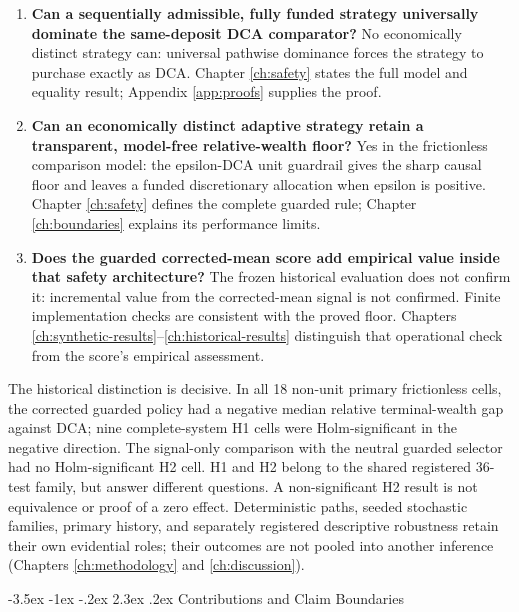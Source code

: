 \documentclass[12pt,a4paper,oneside]{report}
\makeatletter
\renewcommand\section{\@startsection{section}{1}{\z@}%
  {-3.5ex \@plus -1ex \@minus -.2ex}%
  {2.3ex \@plus .2ex}%
  {\normalfont\fontsize{14}{17}\selectfont\bfseries}}
\makeatother
\begin{document}
\begin{enumerate}
  \item \textbf{Can a sequentially admissible, fully funded strategy
  universally dominate the same-deposit DCA comparator?}
  No economically distinct strategy can: universal pathwise dominance forces
  the strategy to purchase exactly as DCA. Chapter \ref{ch:safety} states the
  full model and equality result; Appendix \ref{app:proofs} supplies the proof.
  \item \begin{minipage}[t]{\linewidth}
  \textbf{Can an economically distinct adaptive strategy retain a
  transparent, model-free relative-wealth floor?}
  Yes in the frictionless comparison model: the epsilon-DCA unit guardrail
  gives the sharp causal floor and leaves a funded discretionary allocation
  when epsilon is positive. Chapter \ref{ch:safety} defines the complete
  guarded rule; Chapter \ref{ch:boundaries} explains its performance limits.
  \end{minipage}
  \item \textbf{Does the guarded corrected-mean score add empirical value
  inside that safety architecture?}
  The frozen historical evaluation does not confirm it: incremental value
  from the corrected-mean signal is not confirmed. Finite implementation
  checks are consistent with the proved floor. Chapters
  \ref{ch:synthetic-results}--\ref{ch:historical-results} distinguish that
  operational check from the score's empirical assessment.
\end{enumerate}

The historical distinction is decisive. In all 18 non-unit primary
frictionless cells, the corrected guarded policy had a negative median
relative terminal-wealth gap against DCA; nine complete-system H1 cells were
Holm-significant in the negative direction. The signal-only comparison with
the neutral guarded selector had no Holm-significant H2 cell. H1 and H2
belong to the shared registered 36-test family, but answer different questions.
A non-significant H2 result is not equivalence or proof of a zero effect. Deterministic
paths, seeded stochastic families, primary history, and separately registered
descriptive robustness retain their own evidential roles; their outcomes are
not pooled into another inference (Chapters \ref{ch:methodology} and
\ref{ch:discussion}).

\section{Contributions and Claim Boundaries}
\label{sec:introduction-contributions}
\end{document}
